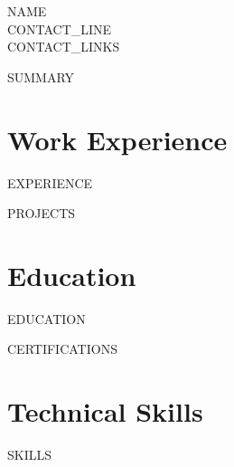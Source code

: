 \documentclass[letterpaper,11pt]{article}
\newcommand{\resumeSubHeadingListStart}{\begin{itemize}[leftmargin=0.0in, label={}]}
\newcommand{\resumeSubHeadingListEnd}{\end{itemize}}
\begin{document}
    \begin{center}
        {\Huge\scshape {{NAME}}}
        \\ {{CONTACT_LINE}}\\
        \small
        {{CONTACT_LINKS}}
    \end{center}

{{SUMMARY}}

\section{Work Experience}
  \resumeSubHeadingListStart
{{EXPERIENCE}}
  \resumeSubHeadingListEnd

{{PROJECTS}}

\section{Education}
  \resumeSubHeadingListStart
{{EDUCATION}}
  \resumeSubHeadingListEnd

{{CERTIFICATIONS}}

\section{Technical Skills}
\vspace{-7pt}
\begin{itemize}
[leftmargin=0.15in, label={}]\small{\item{
{{SKILLS}}
}}
\end{itemize}
\end{document}
